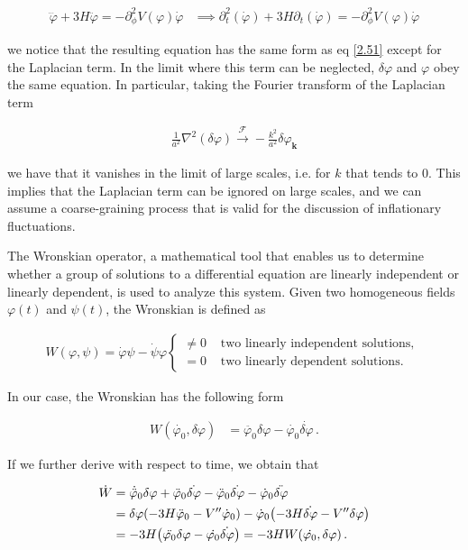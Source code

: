 \begin{align}
    \dddot{\varphi} + 3H\ddot{\varphi} = -\partial_{\phi}^2 V(\varphi)\dot{\varphi} &\implies \partial_{t}^2 {(\dot{\varphi})} + 3H\partial_{t}{(\dot{\varphi})} = - \partial_{\phi}^2 V(\varphi)\dot{\varphi}\label{2.128}
\end{align}

we notice that the resulting equation has the same form as eq \ref{2.51} except for the Laplacian term. In the limit where this term can be neglected, $\delta \varphi$ and $\varphi$ obey the same equation. In particular, taking the Fourier transform of the Laplacian term

\begin{align}
    \frac{1}{a^{2}} \nabla^{2}(\delta \varphi) \stackrel{\mathcal{F}}{\rightarrow}-\frac{k^{2}}{a^{2}} \delta \varphi_{\mathbf{k}}\label{2.129}
\end{align}

we have that it vanishes in the limit of large scales, i.e. for $k$ that tends to 0. This implies that the Laplacian term can be ignored on large scales, and we can assume a coarse-graining process that is valid for the discussion of inflationary fluctuations.

The Wronskian operator, a mathematical tool that enables us to determine whether a group of solutions to a differential equation are linearly independent or linearly dependent, is used to analyze this system. Given two homogeneous fields $\varphi(t)$ and $\psi(t)$, the Wronskian is defined as

\begin{align}
    W(\varphi, \psi)=\dot{\varphi} \psi-\dot{\psi} \varphi \begin{cases}\neq 0 & \text { two linearly independent solutions, } \\ =0 & \text { two linearly dependent solutions. }\end{cases} \label{2.130}
\end{align}

In our case, the Wronskian has the following form

\begin{align}
   W(\dot{\varphi_0}, \delta \varphi ) &= \ddot{\varphi_0} \delta \varphi - \dot{\varphi_0} \dot{ \delta \varphi}\,.\label{2.131}
\end{align}

If we further derive with respect to time, we obtain that


\begin{align}
    \dot{W} &= \dot{\ddot{\varphi}}_0 \delta \varphi + \ddot{\varphi}_0 \dot{ \delta \varphi} - \ddot{\varphi}_0 \dot{\delta \varphi } - \dot{\varphi}_0 \ddot{\delta \varphi }  \\
    &= \delta \varphi \qty(- 3H \ddot{\varphi}_0 - V'' \dot{\varphi}_0 ) - \dot{\varphi}_0 \qty(- 3H \dot{\delta \varphi } - V'' \delta \varphi )  \\
    &= - 3H \qty(\ddot{\varphi_0} \delta \varphi - \dot{\varphi_0} \dot{ \delta \varphi}) = -3HW(\dot{\varphi_0}, \delta \varphi )\label{2.134}
    \,.
\end{align}

